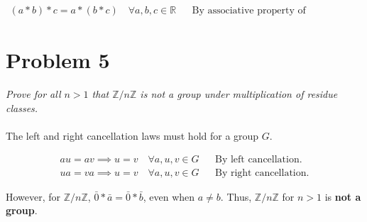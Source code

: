 \documentclass[12pt,letterpaper]{article}
\begin{document}
\begin{enumerate}
   \begin{equation}
      \begin{aligned}
         (a*b)*c = a*(b*c) \quad \forall a, b, c \in \mathbb{R} && \text{By associative property of multiplication.}
      \end{aligned}
   \end{equation}

\end{enumerate}

\section{Problem 5}
\textit{Prove for all $n > 1$ that $\mathbb{Z}/n\mathbb{Z}$ is not a group under multiplication of residue classes.} \\
\\

The left and right cancellation laws must hold for a group $G$.

\begin{equation}
   \begin{aligned}
      au = av \implies u = v \quad \forall a,u,v \in G && \text{By left cancellation.} \\
      ua = va \implies u = v \quad \forall a,u,v \in G && \text{By right cancellation.}
   \end{aligned}
\end{equation}

However, for $\mathbb{Z}/n\mathbb{Z}$, $\bar{0} * \bar{a} = \bar{0} * \bar{b}$, even when $a \neq b$.
Thus, $\mathbb{Z}/n\mathbb{Z}$ for $n > 1$ is \textbf{not a group}.
\end{document}
